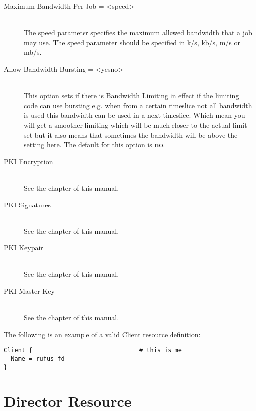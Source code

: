 \begin{description}
\item [Maximum Bandwidth Per Job = {\textless}speed{\textgreater}] \hfill \\
The speed parameter specifies the maximum allowed bandwidth that a job may
use. The speed parameter should be specified in k/s, kb/s, m/s or mb/s.

\item [Allow Bandwidth Bursting = {\textless}yes{\textbar}no{\textgreater}] \hfill \\
This option sets if there is Bandwidth Limiting in effect if the limiting
code can use bursting e.g. when from a certain timeslice not all bandwidth
is used this bandwidth can be used in a next timeslice. Which mean you will
get a smoother limiting which will be much closer to the actual limit set
but it also means that sometimes the bandwidth will be above the setting here.
The default for this option is {\bf no}.

\item [PKI Encryption] \hfill \\
See the  chapter of this manual.

\item [PKI Signatures] \hfill \\
See the  chapter of this manual.

\item [PKI Keypair] \hfill \\
See the  chapter of this manual.

\item [PKI Master Key] \hfill \\
See the  chapter of this manual.

\end{description}

The following is an example of a valid Client resource definition:

\footnotesize
\begin{verbatim}
Client {                              # this is me
  Name = rufus-fd
}
\end{verbatim}
\normalsize

\section{Director Resource}
\label{DirectorResource}

